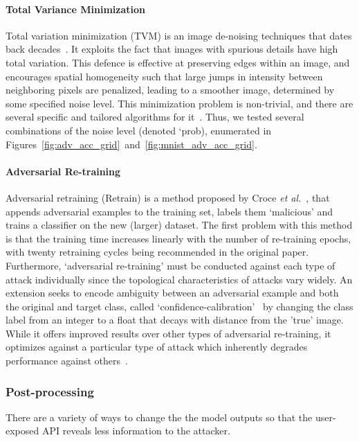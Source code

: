 \documentclass[lettersize,journal]{IEEEtran}
\begin{document}
\paragraph{Total Variance Minimization}
Total variation minimization (TVM) is an image de-noising techniques that dates back decades~\cite{rudin1992nonlinear}. It exploits the fact that images with spurious details have high total variation. This defence is effective at preserving edges within an image, and encourages spatial homogeneity such that large jumps in intensity between neighboring pixels are penalized, leading to a smoother image, determined by some specified noise level. This minimization problem is non-trivial, and there are several specific and tailored algorithms for it~\cite{chambolle2004algorithm,hadj2018continuation}. Thus, we tested several combinations of the noise level (denoted `prob),  enumerated in Figures~\ref{fig:adv_acc_grid}~and~\ref{fig:mnist_adv_acc_grid}.


\paragraph{Adversarial Re-training}
Adversarial retraining (Retrain) is a method proposed by Croce \textit{et al.}~\cite{tsipras_robustness_2019}, that appends adversarial examples to the training set, labels them `malicious' and trains a classifier on the new (larger) dataset. The first problem with this method is that the training time increases linearly with the number of re-training epochs, with twenty retraining cycles being recommended in the original paper. Furthermore, `adversarial re-training' must be conducted against each type of attack individually since the topological characteristics of attacks vary widely. An extension seeks to encode ambiguity between an adversarial example and both the original and target class, called `confidence-calibration'~\cite{croce_reliable_2020} by changing the class label from an integer to a float that decays with distance from the 'true' image. While it offers improved results over other types of adversarial re-training, it optimizes against a particular type of attack which inherently degrades performance against others~\cite{carlini_towards_2017}.

\subsubsection{Post-processing}
\label{post-processing}
There are a variety of ways to change the the model outputs so that the user-exposed API reveals less information to the attacker.
\end{document}

